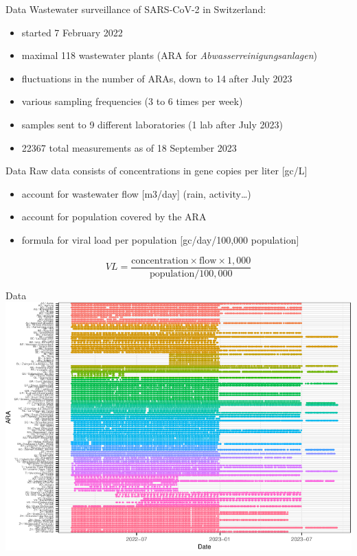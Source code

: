 \documentclass[
  ignorenonframetext,
]{beamer}
\begin{document}
\begin{frame}{Data}
\protect\hypertarget{data}{}
Wastewater surveillance of SARS-CoV-2 in Switzerland:

\begin{itemize}
\item
  started 7 February 2022
\item
  maximal \alert{118 wastewater plants} (ARA for
  \emph{Abwasserreinigungsanlagen})
\item
  fluctuations in the number of ARAs, down to 14 after July 2023
\item
  various sampling frequencies (3 to 6 times per week)
\item
  samples sent to \alert{9 different laboratories} (1 lab after July
  2023)
\item
  22367 total measurements as of 18 September 2023
\end{itemize}
\end{frame}

\begin{frame}{Data}
\protect\hypertarget{data-1}{}
Raw data consists of \alert{concentrations} in gene copies per liter
{[}gc/L{]}

\begin{itemize}
\item
  account for \alert{wastewater flow} {[}m3/day{]} (rain,
  activity\ldots)
\item
  account for \alert{population} covered by the ARA
\item
  formula for \alert{viral load per population} {[}gc/day/100,000
  population{]}
\end{itemize}

\[
VL = \frac{\text{concentration} \times \text{flow} \times 1,000}{\text{population} / 100,000}
\]
\end{frame}

\begin{frame}{Data}
\protect\hypertarget{data-2}{}
\includegraphics{2023-11-07_pres_files/figure-beamer/data_mis1-1.pdf}
\end{frame}
\end{document}
